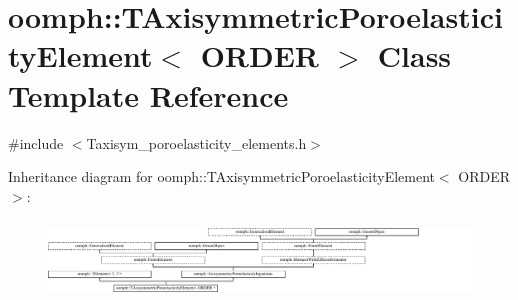 \hypertarget{classoomph_1_1TAxisymmetricPoroelasticityElement}{}\section{oomph\+:\+:T\+Axisymmetric\+Poroelasticity\+Element$<$ O\+R\+D\+ER $>$ Class Template Reference}
\label{classoomph_1_1TAxisymmetricPoroelasticityElement}


{\ttfamily \#include $<$Taxisym\+\_\+poroelasticity\+\_\+elements.\+h$>$}

Inheritance diagram for oomph\+:\+:T\+Axisymmetric\+Poroelasticity\+Element$<$ O\+R\+D\+ER $>$\+:\begin{figure}[H]
\begin{center}
\leavevmode
\includegraphics[height=2.114804cm]{classoomph_1_1TAxisymmetricPoroelasticityElement}
\end{center}
\end{figure}

